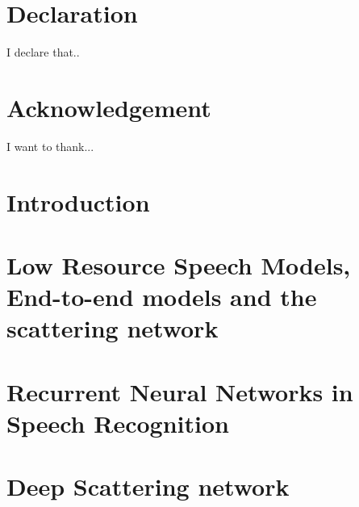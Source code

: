 \documentclass[12pt,twoside]{report}
\begin{document}
\chapter*{Declaration}
I declare that..

\chapter*{Acknowledgement}
I want to thank...

\tableofcontents

\chapter{Introduction}


\chapter{Low Resource Speech Models, End-to-end models and the scattering network}\label{c02}


\chapter{Recurrent Neural Networks in Speech Recognition}


\chapter{Deep Scattering network}





\end{document}
